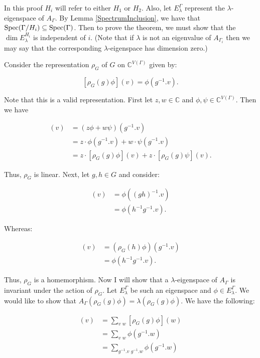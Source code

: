 In this proof $H_i$ will refer to either $H_1$ or $H_2$. Also, let $E_\lambda^{\Gamma}$ represent the $\lambda$-eigenspace of $A_\Gamma$. By Lemma \ref{SpectrumInclusion}, we have that $ \operatorname*{Spec}(\Gamma / H_i) \subseteq \operatorname*{Spec}(\Gamma) $. Then to prove the theorem, we must show that the $\operatorname{dim} E_\lambda^{H_i}$ is independent of $i$. (Note that if $\lambda$ is not an eigenvalue of $A_{\Gamma_i}$ then we may say that the corresponding $\lambda$-eigenspace has dimension zero.)

Consider the representation $\rho_G$ of $G$ on $\mathbb{C}^{V(\Gamma)}$ given by:

$$
[\rho_G(g)\phi](v) = \phi(g^{-1}.v).
$$

Note that this is a valid representation. First let $z,w \in \mathbb{C}$ and $\phi, \psi \in \mathbb{C}^{V(\Gamma)}$. Then we have

\begin{align*}
    [ \rho_G(g)(z \phi + w \psi) ](v) &= (z \phi + w \psi)(g^{-1}.v) \\
    &= z \cdot \phi(g^{-1}.v) + w \cdot \psi(g^{-1}.v) \\
    &= z \cdot [ \rho_G(g)\phi ](v) + z \cdot [ \rho_G(g)\psi ](v).
\end{align*}

Thus, $\rho_G$ is linear. Next, let $g, h \in G$ and consider:

\begin{align*}
    [ \rho_G(gh)\phi ](v) &= \phi((gh)^{-1}.v) \\
    &= \phi(h^{-1}g^{-1}.v).
\end{align*}

Whereas:

\begin{align*}
    [ (\rho_G(g) \circ \rho_G(h))\phi ](v) &= (\rho_G(h)\phi)(g^{-1}.v) \\
    &= \phi(h^{-1}g^{-1}.v).
\end{align*}

Thus, $\rho_G$ is a homemorphism. Now I will show that a $\lambda$-eigenspace of $A_\Gamma$ is invariant under the action of $\rho_G$. Let $E_{\lambda}^{\Gamma}$ be such an eigenspace and $\phi \in E_{\lambda}^{\Gamma}$. We would like to show that $A_\Gamma (\rho_G(g)\phi) = \lambda (\rho_G(g)\phi)$. We have the following:

\begin{align*}
[A_\Gamma (\rho_G(g)\phi)](v) &= \sum_{v \text{~} w} [ \rho_G(g)\phi ](w) \\
&= \sum_{v \text{~} w} \phi(g^{-1}.w) \\
&= \sum_{g^{-1}.v \text{~} g^{-1}.w} \phi(g^{-1}.w)
\end{align*}

